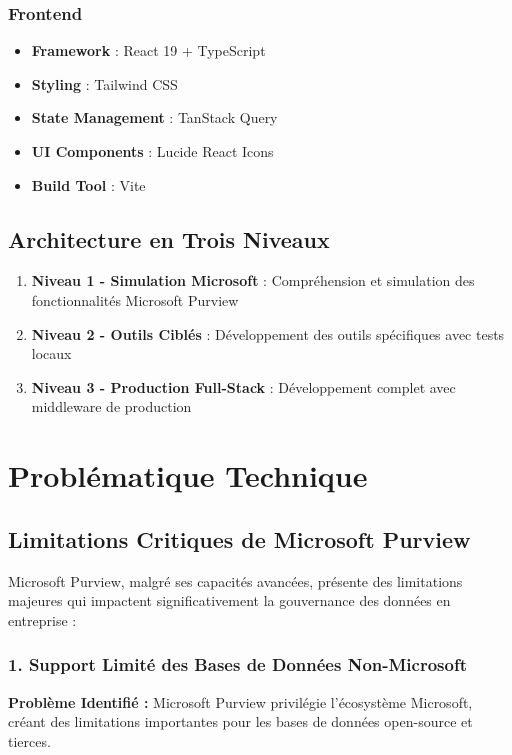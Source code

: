 \documentclass[12pt,a4paper]{article}
\begin{document}
\subsubsection{Frontend}
\begin{itemize}
    \item \textbf{Framework} : React 19 + TypeScript
    \item \textbf{Styling} : Tailwind CSS
    \item \textbf{State Management} : TanStack Query
    \item \textbf{UI Components} : Lucide React Icons
    \item \textbf{Build Tool} : Vite
\end{itemize}

\subsection{Architecture en Trois Niveaux}

\begin{enumerate}
    \item \textbf{Niveau 1 - Simulation Microsoft} : Compréhension et simulation des fonctionnalités Microsoft Purview
    \item \textbf{Niveau 2 - Outils Ciblés} : Développement des outils spécifiques avec tests locaux
    \item \textbf{Niveau 3 - Production Full-Stack} : Développement complet avec middleware de production
\end{enumerate}

\section{Problématique Technique}

\subsection{Limitations Critiques de Microsoft Purview}

Microsoft Purview, malgré ses capacités avancées, présente des limitations majeures qui impactent significativement la gouvernance des données en entreprise :

\subsubsection{1. Support Limité des Bases de Données Non-Microsoft}

\textbf{Problème Identifié :} Microsoft Purview privilégie l'écosystème Microsoft, créant des limitations importantes pour les bases de données open-source et tierces.
\end{document}
